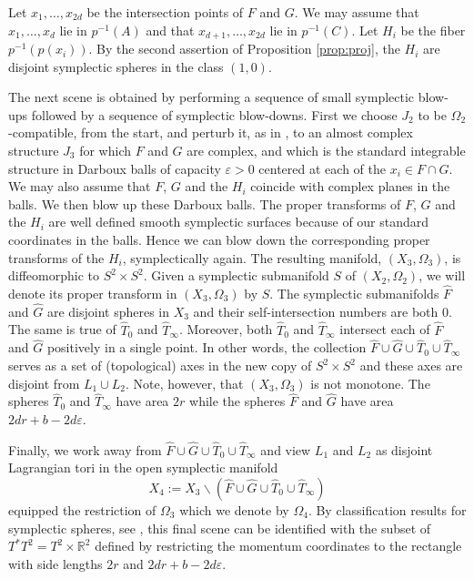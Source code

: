 \documentclass[12pt]{amsart}
\theoremstyle{definition}
\newcommand{\RR}{{\mathbb R}}
\begin{document}
\bigskip

 Let $x_1, \dots, x_{2d}$ be the intersection points of $F$ and $G$. We may assume that $x_1, \dots, x_{d}$ lie in $p^{-1}(A)$ and that $x_{d+1}, \dots, x_{2d}$ lie in $p^{-1}(C)$. Let $H_i$ be the fiber $p^{-1}(p(x_i))$. By the second assertion of Proposition \ref{prop:proj}, the $H_i$ are disjoint symplectic spheres in the class $(1,0)$.



The next scene is obtained by performing a sequence of small symplectic blow-ups followed by a sequence of symplectic blow-downs. First we choose $J_2$ to be $\Omega_2$-compatible, from the start, and perturb it, as in \cite{boust}, to an almost complex structure $J_3$ for which $F$ and $G$ are complex, and which is the standard integrable structure in Darboux balls of capacity $\varepsilon>0$ centered at each of the $x_i \in F \cap G$. 
We may also assume that $F$, $G$ and the $H_i$ coincide with complex planes in the balls.
We then blow up these Darboux balls. The proper transforms of $F$, $G$ and the $H_i$ are well defined smooth symplectic surfaces because of our standard coordinates in the balls. Hence we can blow down the corresponding proper transforms of the $H_i$, symplectically again. The resulting manifold, $(X_3, \Omega_3)$, is diffeomorphic to $S^2 \times S^2$. Given a symplectic submanifold $S$ of $(X_2, \Omega_2)$, we will denote its proper transform in $(X_3, \Omega_3)$ by $\hat{S}$. The symplectic submanifolds $\hat{F}$ and $\hat{G}$ are disjoint spheres in $X_3$ and their self-intersection numbers are both $0$. The same is true of $\hat{T}_0$ and $\hat{T}_{\infty}$.  Moreover, both $\hat{T}_0$ and $\hat{T}_{\infty}$ intersect each of $\hat{F}$ and $\hat{G}$ positively in a single point. In other words, the collection $\hat{F} \cup  \hat{G} \cup \hat{T}_0 \cup \hat{T}_{\infty}$ serves as a set of (topological) axes in the new copy of $S^2\times S^2$ and these axes are disjoint from $L_1 \cup L_2$.
Note, however, that $(X_3, \Omega_3)$ is not monotone. The spheres $\hat{T}_0$ and $\hat{T}_{\infty}$ have area $2r$ while the spheres $\hat{F}$ and $\hat{G}$ have area $2dr + b - 2d \varepsilon$.


\bigskip

 Finally, we work away from $\hat{F} \cup  \hat{G} \cup \hat{T}_0 \cup \hat{T}_{\infty}$ and view $L_1$ and $L_2$ as disjoint Lagrangian tori in the open symplectic manifold 
$$X_4 := X_3 \smallsetminus ( \hat{F} \cup  \hat{G} \cup \hat{T}_0 \cup \hat{T}_{\infty} )$$
equipped the restriction of $\Omega_3$ which we denote by $\Omega_4$. By classification results for symplectic spheres, see \cite{mcdrat}, this final scene can be identified with the subset of $T^* T^2 = T^2 \times\RR^2$ defined by restricting the momentum coordinates to the rectangle with side lengths $2r$ and $2dr + b - 2d \varepsilon$.
\end{document}
